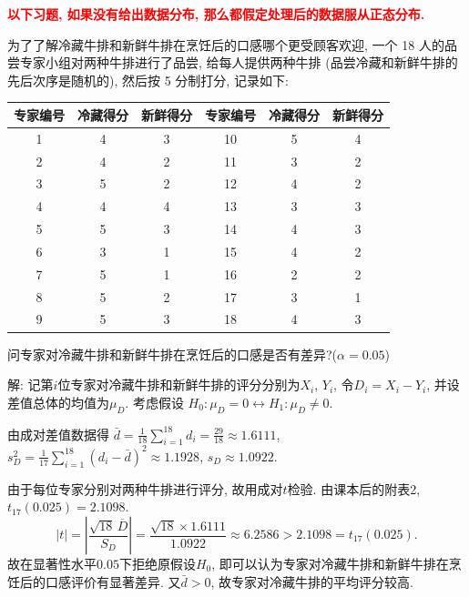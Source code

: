 \documentclass[standard]{ExBook}
\renewenvironment{shaded}{%
  \def\FrameCommand{\fboxsep=\FrameSep \colorbox{shadecolor}}%
  \MakeFramed{\advance\hsize-\width \FrameRestore}%
}{%
  \endMakeFramed
}
\begin{document}
\begin{qitems}
    \begin{center}
\textcolor{red}{\textbf{以下习题, 如果没有给出数据分布, 那么都假定处理后的数据服从正态分布.}}
    \end{center}

    \begin{bbox}
    \begin{shaded}
        \qitem
为了了解冷藏牛排和新鲜牛排在烹饪后的口感哪个更受顾客欢迎, 一个 18 人的品尝专家小组对两种牛排进行了品尝, 给每人提供两种牛排 (品尝冷藏和新鲜牛排的先后次序是随机的), 然后按 5 分制打分, 记录如下:
\begin{center}
\renewcommand{\arraystretch}{1}
\setlength{\tabcolsep}{15pt}
\begin{tabular}{c|cc||c|cc}
\hline
专家编号 & 冷藏得分 & 新鲜得分 & 专家编号 & 冷藏得分 & 新鲜得分 \\
\hline
1 & 4 & 3 & 10 & 5 & 4 \\
2 & 4 & 2 & 11 & 3 & 2 \\
3 & 5 & 2 & 12 & 4 & 2 \\
4 & 4 & 4 & 13 & 3 & 3 \\
5 & 5 & 3 & 14 & 4 & 3 \\
6 & 3 & 1 & 15 & 4 & 2 \\
7 & 5 & 1 & 16 & 2 & 2 \\
8 & 5 & 2 & 17 & 3 & 1 \\
9 & 5 & 3 & 18 & 4 & 3 \\
\hline
\end{tabular}
\end{center}
问专家对冷藏牛排和新鲜牛排在烹饪后的口感是否有差异?($\alpha = 0.05$)
    \end{shaded}
    \end{bbox}

\vspace{\dimexpr2.5cm-5em\relax}

解: 记第$i$位专家对冷藏牛排和新鲜牛排的评分分别为$X_i$, $Y_i$, 令$D_i=X_i-Y_i$, 并设差值总体的均值为$\mu_D$. 考虑假设
$
H_0:\mu_D=0
\longleftrightarrow
H_1:\mu_D\neq0
$.

由成对差值数据得
$
\bar{d}
=\frac{1}{18}\sum_{i=1}^{18}d_i
=\frac{29}{18}
\approx1.6111
$,
$
s_D^2
=\frac{1}{17}\sum_{i=1}^{18}(d_i-\bar{d})^2
\approx1.1928
$,
$
s_D\approx1.0922
$.

由于每位专家分别对两种牛排进行评分, 故用成对$t$检验. 由课本后的附表2, $t_{17}(0.025)=2.1098$.
$$
|t|
=
\left|
\frac{\sqrt{18}\,\overline{D}}{S_D}
\right|
=
\frac{\sqrt{18}\times1.6111}{1.0922}
\approx6.2586
>
2.1098
=
t_{17}(0.025).
$$
故在显著性水平$0.05$下拒绝原假设$H_0$, 即可以认为专家对冷藏牛排和新鲜牛排在烹饪后的口感评价有显著差异. 又$\bar{d}>0$, 故专家对冷藏牛排的平均评分较高.


\end{qitems}
\end{document}
